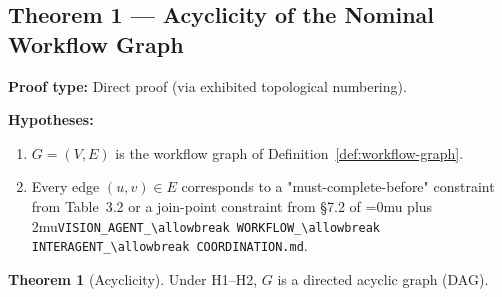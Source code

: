 \documentclass[12pt]{article}
\theoremstyle{definition}
\newtheorem{theorem}{Theorem}
\DeclareRobustCommand{\code}[1]{\begingroup\Urlmuskip=0mu plus 2mu\relax\nolinkurl{#1}\endgroup}
\newcommand{\VisionFlow}{\code{VISION\_AGENT\_\allowbreak WORKFLOW\_\allowbreak INTERAGENT\_\allowbreak COORDINATION.md}}
\begin{document}
\subsection{Theorem 1 --- Acyclicity of the Nominal Workflow Graph}

\textbf{Proof type:} Direct proof (via exhibited topological numbering).

\textbf{Hypotheses:}
\begin{enumerate}
    \item[H1] $G = (V,E)$ is the workflow graph of Definition~\ref{def:workflow-graph}.
    \item[H2] Every edge $(u,v) \in E$ corresponds to a "must-complete-before"
              constraint from Table~3.2 or a join-point constraint from
              \S7.2 of \VisionFlow{}.
\end{enumerate}

\begin{theorem}[Acyclicity]
\label{thm:acyclic}
Under H1--H2, $G$ is a directed acyclic graph (DAG).
\end{theorem}
\end{document}
